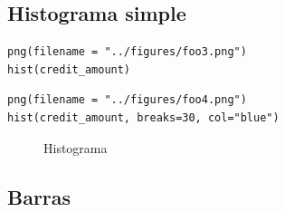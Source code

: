 \subsection{Histograma simple}

\begin{verbatim}
png(filename = "../figures/foo3.png")
hist(credit_amount)
\end{verbatim}

\begin{verbatim}
png(filename = "../figures/foo4.png")
hist(credit_amount, breaks=30, col="blue") 
\end{verbatim}

\begin{figure}[h]
 \begin{center}
 \hspace{0.1cm}
 \caption{Histograma}
 \label{fig:histograma}
 \end{center}
\end{figure}

\subsection{Barras}

